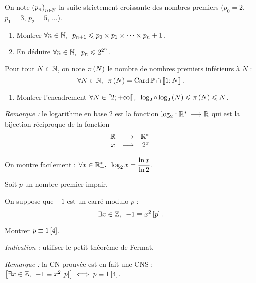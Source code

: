 \begin{exo}[Exercice 17]
On note \(\left(p_n\right)_{n\in\mathbb{N}}\) la suite strictement croissante des nombres premiers (\cad \(p_0=2\), \(p_1=3\), \(p_2=5\), ...).

\begin{enumerate}[series=exsuitepremiers]
\item Montrer \(\quantifs{\forall n\in\N}p_{n+1}\leq p_0\times p_1\times\dots\times p_n+1\). \\

\item En déduire \(\quantifs{\forall n\in\N}p_n\leq2^{2^n}\).
\end{enumerate}

Pour tout \(N\in\mathbb{N}\), on note \(\pi\left(N\right)\) le nombre de nombres premiers inférieurs à \(N\) : \[\quantifs{\forall N\in\N}\pi\paren{N}=\Card\prem\inter\interventierii{1}{N}.\]

\begin{enumerate}[resume=exsuitepremiers]
\item Montrer l'encadrement \(\quantifs{\forall N\in\interventierie{2}{\pinf}}\log_2\rond\log_2\paren{N}\leq\pi\paren{N}\leq N\).
\end{enumerate}

\textit{Remarque :} le logarithme en base \(2\) est la fonction \(\log_2:\mathbb{R}_+^*\longrightarrow\mathbb{R}\) qui est la bijection réciproque de la fonction \[\begin{array}[t]{ccc}\mathbb{R} & \longrightarrow & \mathbb{R}_+^* \\ x & \longmapsto & 2^x\end{array}\]

On montre facilement : \(\quantifs{\forall x\in\Rps}\log_2 x=\dfrac{\ln x}{\ln2}\).
\end{exo}

\begin{corr}
\end{corr}

\begin{exo}[Exercice 18]
Soit \(p\) un nombre premier impair.

On suppose que \(-1\) est un carré modulo \(p\) : \[\quantifs{\exists x\in\Z}-1\equiv x^2\croch{p}.\]

Montrer \(p\equiv1\left[4\right]\).

\textit{Indication :} utiliser le petit théorème de Fermat.

{\small \textit{Remarque :} la CN prouvée est en fait une CNS : \(\croch{\quantifs{\exists x\in\Z}-1\equiv x^2\croch{p}}\ssi p\equiv1\croch{4}\).}
\end{exo}

\begin{corr}
\end{corr}

